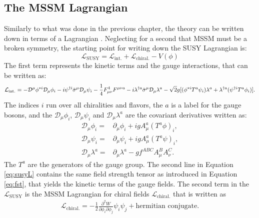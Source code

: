\subsection*{The MSSM Lagrangian}
\noindent\justify
Similarly to what was done in the previous chapter, the theory can be written down in terms of a Lagrangian \cite{Pape:2006ar}. 
Neglecting for a second that MSSM must be a broken symmetry, the starting point for writing down the SUSY Lagrangian is:
\begin{equation} 
\mathcal{L}_{\mathrm{SUSY}}=\mathcal{L}_{\mathrm{int.}}+\mathcal{L}_{\mathrm{chiral.}}- V(\phi)
\end{equation}
The first term represents the kinetic terms and the gauge interactions, that can be written as:
\begin{equation} 
\mathcal{L}_{\mathrm{int.}}=-\mathcal{D}^{\mu}\phi^{*i}\mathcal{D}_{\mu}\phi_{i}-i\psi^{\dagger i}\bar{\sigma}^{\mu}\mathcal{D}_{\mu}\psi_{i}\\
                   -\frac{1}{4}F_{\mu\nu}^{4}F^{\mu\nu a}-i\lambda^{\dagger a}\bar{\sigma}^{\mu}\mathcal{D}_{\mu}\lambda^{a}\\
                   -\sqrt{2}g[(\phi^{*i}T^{a}\psi_{i})\lambda^{a}+\lambda^{\dagger a}(\psi^{\dagger i}T^{a}\phi_{i})].
\label{eq:susyL}
\end{equation}
The indices $i$ run over all chiralities and flavors, the $a$ is a label for the gauge bosons, and the $\mathcal{D}_{\mu}\phi_{i}$, $\mathcal{D}_{\mu}\psi_{i}$ and $\mathcal{D}_{\mu}\lambda^{a}$ are the covariant derivatives written as:
\begin{align} 
\mathcal{D}_{\mu}\phi_{i}=&\partial_{\mu}\phi_{i}+igA_{\mu}^{a}(T^{a}\phi)_{i},\\
\mathcal{D}_{\mu}\psi_{i}=&\partial_{\mu}\psi_{i}+igA_{\mu}^{a}(T^{a}\psi)_{i},\\
\mathcal{D}_{\mu}\lambda^{a}=&\partial_{\mu}\lambda^{a}-g f^{ABC}A_{\mu}^{B}A_{\nu}^{C}.
\end{align}
The $T^{a}$ are the generators of the gauge group. 
The second line in Equation \ref{eq:susyL} contains the same field strength tensor as introduced in Equation \ref{eq:fst}, that yields the kinetic terms of the gauge fields.
The second term in the $\mathcal{L}_{\mathrm{SUSY}}$ is the MSSM Lagrangian for chiral fields $\mathcal{L}_{\mathrm{chiral.}}$ that is written as 
\begin{align} 
\mathcal{L}_{\mathrm{chiral.}}=-\frac{1}{2}\frac{\partial^{2}W}{\partial \phi_{i}\partial \phi_{j}}\psi_{i}\psi_{j}+\mathrm{hermitian\,\,conjugate}.
\end{align}
